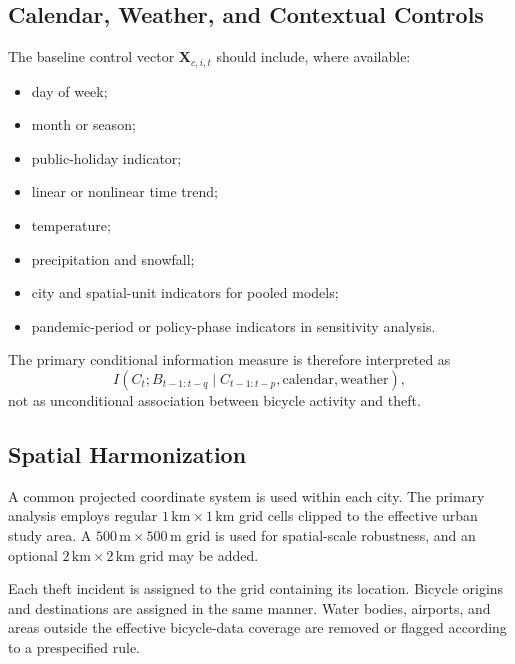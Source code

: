 \documentclass[applsci,article,submit,moreauthors]{Definitions/mdpi}
\begin{document}

\subsection{Calendar, Weather, and Contextual Controls}
\label{subsec:controls}

The baseline control vector $\mathbf{X}_{c,i,t}$ should include, where available:
\begin{itemize}
    \item day of week;
    \item month or season;
    \item public-holiday indicator;
    \item linear or nonlinear time trend;
    \item temperature;
    \item precipitation and snowfall;
    \item city and spatial-unit indicators for pooled models;
    \item pandemic-period or policy-phase indicators in sensitivity analysis.
\end{itemize}
The primary conditional information measure is therefore interpreted as
\begin{equation}
I\left(C_t;B_{t-1:t-q}\mid C_{t-1:t-p},\text{calendar},\text{weather}\right),
\end{equation}
not as unconditional association between bicycle activity and theft.

\subsection{Spatial Harmonization}
\label{subsec:spatial_harmonization}

A common projected coordinate system is used within each city. The primary analysis employs regular $1\,\mathrm{km}\times1\,\mathrm{km}$ grid cells clipped to the effective urban study area. A $500\,\mathrm{m}\times500\,\mathrm{m}$ grid is used for spatial-scale robustness, and an optional $2\,\mathrm{km}\times2\,\mathrm{km}$ grid may be added.

Each theft incident is assigned to the grid containing its location. Bicycle origins and destinations are assigned in the same manner. Water bodies, airports, and areas outside the effective bicycle-data coverage are removed or flagged according to a prespecified rule.
\end{document}
